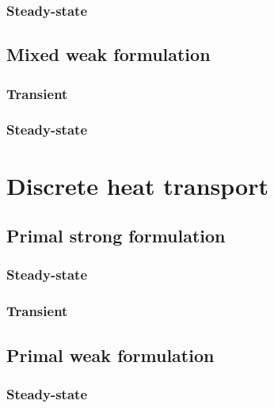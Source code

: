 \documentclass[fleqn]{article}
\theoremstyle{definition}
\begin{document}
\subsubsection{Steady-state}

\subsection{Mixed weak formulation}
\subsubsection{Transient}


\subsubsection{Steady-state}


\section{Discrete heat transport}
\label{section:discrete_heat_transport}


\subsection{Primal strong formulation}
\subsubsection{Steady-state}

\subsubsection{Transient}


\subsection{Primal weak formulation}
\subsubsection{Steady-state}


\end{document}
